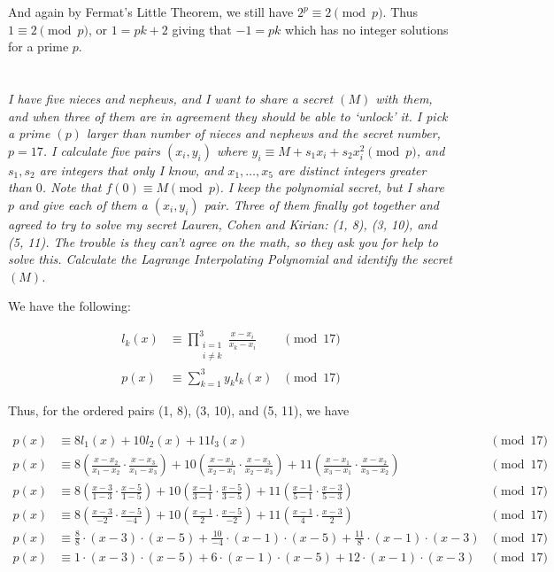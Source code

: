 \documentclass[12pt]{article}
\begin{document}
        And again by Fermat's Little Theorem, we still have $2^p \equiv 2 \pmod{p}$. Thus $1 \equiv 2 \pmod{p}$, or $1 = pk + 2$ giving that $-1 = pk$ which has no integer solutions for a prime $p$.

\newpage

\section{} \textit{I have five nieces and nephews, and I want to share a secret $(M)$ with them, and when three of them are in agreement they should be able to `unlock' it. I pick a prime $(p)$ larger than number of nieces and nephews and the secret number, $p = 17$. I calculate five pairs $(x_i, y_i)$ where $y_i \equiv M + s_1 x_i + s_2 x_i ^ 2\pmod{p}$, and $s_1, s_2$ are integers that only I know, and $x_1, \dots, x_5$ are distinct integers greater than $0$. Note that $f(0) \equiv M \pmod{p}$. I keep the polynomial secret, but I share $p$ and give each of them a $(x_i, y_i)$ pair. Three of them finally got together and agreed to try to solve my secret Lauren, Cohen and Kirian: (1, 8), (3, 10), and (5, 11). The trouble is they can't agree on the math, so they ask you for help to solve this. Calculate the Lagrange Interpolating Polynomial and identify the secret $(M)$.}

    We have the following:

    \begin{align*}
        l_k(x) &\equiv \prod_{\substack{i = 1 \\ i \neq k}}^3 \frac{x - x_i}{x_k - x_i} &\pmod{17}\\
        p(x) &\equiv \sum_{k = 1}^3 y_k l_k(x) &\pmod{17}
    \end{align*}

    Thus, for the ordered pairs (1, 8), (3, 10), and (5, 11), we have

    \begin{align*}
        p(x) &\equiv 8l_1(x) + 10l_2(x) + 11l_3(x) &\pmod{17}\\
        p(x) &\equiv 8\left(\frac{x - x_2}{x_1 - x_2} \cdot \frac{x - x_3}{x_1 - x_3}\right) + 10\left(\frac{x - x_1}{x_2 - x_1} \cdot \frac{x - x_3}{x_2 - x_3}\right) + 11\left(\frac{x - x_1}{x_3 - x_1} \cdot \frac{x - x_2}{x_3 - x_2}\right) &\pmod{17}\\
        p(x) &\equiv 8\left(\frac{x - 3}{1 - 3} \cdot \frac{x - 5}{1 - 5}\right) + 10\left(\frac{x - 1}{3 - 1} \cdot \frac{x - 5}{3 - 5}\right) + 11\left(\frac{x - 1}{5 - 1} \cdot \frac{x - 3}{5 - 3}\right) &\pmod{17}\\
        p(x) &\equiv 8\left(\frac{x - 3}{-2} \cdot \frac{x - 5}{-4}\right) + 10\left(\frac{x - 1}{2} \cdot \frac{x - 5}{-2}\right) + 11\left(\frac{x - 1}{4} \cdot \frac{x - 3}{2}\right) &\pmod{17}\\
        p(x) &\equiv \frac{8}{8} \cdot (x - 3) \cdot (x - 5) + \frac{10}{-4} \cdot (x - 1) \cdot (x - 5) + \frac{11}{8} \cdot (x - 1) \cdot (x - 3) &\pmod{17}\\
        p(x) &\equiv 1 \cdot (x - 3) \cdot (x - 5) + 6 \cdot (x - 1) \cdot (x - 5) + 12 \cdot (x - 1) \cdot (x - 3) &\pmod{17}\\
    \end{align*}
\end{document}
